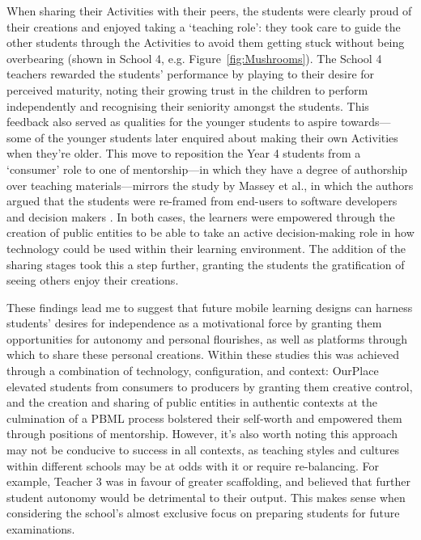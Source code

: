 When sharing their Activities with their peers, the students were clearly proud of their creations and enjoyed taking a `teaching role': they took care to guide the other students through the Activities to avoid them getting stuck without being overbearing (shown in School 4, e.g. Figure~\ref{fig:Mushrooms}). The School 4 teachers rewarded the students' performance by playing to their desire for perceived maturity, noting their growing trust in the children to perform independently and recognising their seniority amongst the students. This feedback also served as qualities for the younger students to aspire towards---some of the younger students later enquired about making their own Activities when they're older. This move to reposition the Year 4 students from a `consumer' role to one of mentorship---in which they have a degree of authorship over teaching materials---mirrors the study by Massey et al., in which the authors argued that the students were re-framed from end-users to software developers and decision makers \citep{Massey2006}. In both cases, the learners were empowered through the creation of public entities to be able to take an active decision-making role in how technology could be used within their learning environment. The addition of the sharing stages took this a step further, granting the students the gratification of seeing others enjoy their creations.
 
These findings lead me to suggest that future mobile learning designs can harness students' desires for independence as a motivational force by granting them opportunities for autonomy and personal flourishes, as well as platforms through which to share these personal creations. Within these studies this was achieved through a combination of technology, configuration, and context: OurPlace elevated students from consumers to producers by granting them creative control, and the creation and sharing of public entities in authentic contexts at the culmination of a PBML process bolstered their self-worth and empowered them through positions of mentorship. However, it's also worth noting this approach may not be conducive to success in all contexts, as teaching styles and cultures within different schools may be at odds with it or require re-balancing. For example, Teacher 3 was in favour of greater scaffolding, and believed that further student autonomy would be detrimental to their output. This makes sense when considering the school's almost exclusive focus on preparing students for future examinations. 

